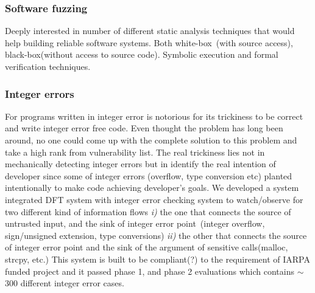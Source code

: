 \documentclass[letterpaper, 10pt]{article}
\begin{document}
\begin{small}
\subsubsection*{Software fuzzing}

Deeply interested in number of different static analysis techniques that would
help building reliable software systems. Both white-box~(with source access),
black-box(without access to source code). Symbolic execution and formal
verification techniques.

\subsubsection*{Integer errors} 

For programs written in integer error is notorious for its trickiness to be
correct and write integer error free code. Even thought the problem has long
been around, no one could come up with the complete solution to this problem
and take a high rank from vulnerability list. 
%
The real trickiness lies not in mechanically detecting integer errors but in
identify the real intention of developer since some of integer errors
(overflow, type conversion etc) planted intentionally to make code achieving
developer's goals.
%
We developed a system integrated DFT system with integer error checking system
to watch/observe for two different kind of information flows {\it i)} the one
that connects the source of untrusted input, and the sink of integer error
point~(integer overflow, sign/unsigned extension, type conversions) {\it ii)}
the other that connects the source of integer error point and the sink of the
argument of sensitive calls(malloc, strcpy, etc.)
% 
This system is built to be compliant(?) to the requirement of IARPA funded
project and it passed phase 1, and phase 2 evaluations which contains $\sim$
300 different integer error cases.

\end{small}
\newpage



\end{document}
